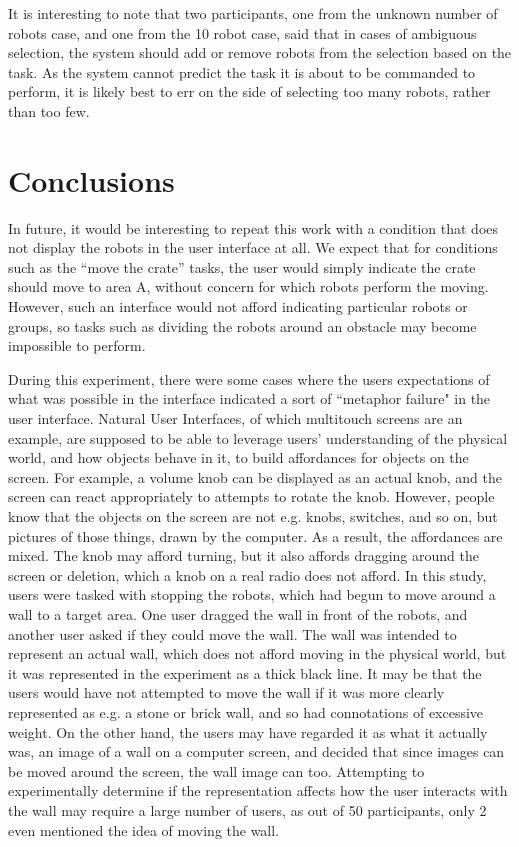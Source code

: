 It is interesting to note that two participants, one from the unknown number of robots case, and one from the 10 robot case, said that in cases of ambiguous selection, the system should add or remove robots from the selection based on the task. 
As the system cannot predict the task it is about to be commanded to perform, it is likely best to err on the side of selecting too many robots, rather than too few. 


\section{Conclusions} \label{section:Conclusions}

In future, it would be interesting to repeat this work with a condition that does not display the robots in the user interface at all. 
We expect that for conditions such as the ``move the crate'' tasks, the user would simply indicate the crate should move to area A, without concern for which robots perform the moving. 
However, such an interface would not afford indicating particular robots or groups, so tasks such as dividing the robots around an obstacle may become impossible to perform.

During this experiment, there were some cases where the users expectations of what was possible in the interface indicated a sort of ``metaphor failure" in the user interface. 
Natural User Interfaces, of which multitouch screens are an example, are supposed to be able to leverage users' understanding of the physical world, and how objects behave in it, to build affordances for objects on the screen. 
For example, a volume knob can be displayed as an actual knob, and the screen can react appropriately to attempts to rotate the knob. 
However, people know that the objects on the screen are not e.g. knobs, switches, and so on, but pictures of those things, drawn by the computer. 
As a result, the affordances are mixed. 
The knob may afford turning, but it also affords dragging around the screen or deletion, which a knob on a real radio does not afford. 
In this study, users were tasked with stopping the robots, which had begun to move around a wall to a target area. 
One user dragged the wall in front of the robots, and another user asked if they could move the wall. 
The wall was intended to represent an actual wall, which does not afford moving in the physical world, but it was represented in the experiment as a thick black line. 
It may be that the users would have not attempted to move the wall if it was more clearly represented as e.g. a stone or brick wall, and so had connotations of excessive weight. 
On the other hand, the users may have regarded it as what it actually was, an image of a wall on a computer screen, and decided that since images can be moved around the screen, the wall image can too. 
Attempting to experimentally determine if the representation affects how the user interacts with the wall may require a large number of users, as out of 50 participants, only 2 even mentioned the idea of moving the wall. 

